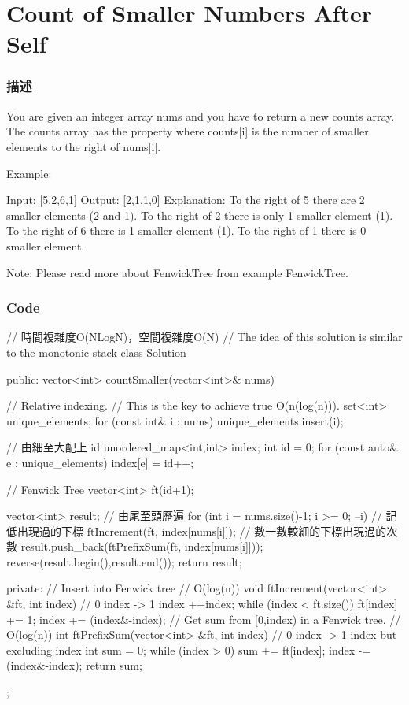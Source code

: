 \section{Count of Smaller Numbers After Self} %
\label{sec:count-of-smaller-numbers-after-self}

\subsubsection{描述}
You are given an integer array nums and you have to return a new counts array. The counts array has the property where counts[i] is the number of smaller elements to the right of nums[i].

Example:
\begin{Code}
Input: [5,2,6,1]
Output: [2,1,1,0] 
Explanation:
To the right of 5 there are 2 smaller elements (2 and 1).
To the right of 2 there is only 1 smaller element (1).
To the right of 6 there is 1 smaller element (1).
To the right of 1 there is 0 smaller element.
\end{Code}

Note:
Please read more about FenwickTree from example FenwickTree.

\subsubsection{Code}
\begin{Code}
// 時間複雜度O(NLogN)，空間複雜度O(N)
// The idea of this solution is similar to the monotonic stack
class Solution {
public:
    vector<int> countSmaller(vector<int>& nums)
    {
        // Relative indexing.
        // This is the key to achieve true O(n(log(n))).
        set<int> unique_elements;
        for (const int& i : nums) unique_elements.insert(i);

        // 由細至大配上 id
        unordered_map<int,int> index;
        int id = 0;
        for (const auto& e : unique_elements) index[e] = id++;

        // Fenwick Tree
        vector<int> ft(id+1);

        vector<int> result;
        // 由尾至頭歷遍
        for (int i = nums.size()-1; i >= 0; --i)
        {
            // 記低出現過的下標
            ftIncrement(ft, index[nums[i]]);
            // 數一數較細的下標出現過的次數
            result.push_back(ftPrefixSum(ft, index[nums[i]]));
        }
        reverse(result.begin(),result.end());
        return result;
    }
private:
    // Insert into Fenwick tree
    // O(log(n))
    void ftIncrement(vector<int> &ft, int index)
    {
        // 0 index -> 1 index
        ++index;
        while (index < ft.size())
        {
            ft[index] += 1;
            index += (index&-index);
        }
    }
    // Get sum from [0,index) in a Fenwick tree.
    // O(log(n))
    int ftPrefixSum(vector<int> &ft, int index)
    {
        // 0 index -> 1 index but excluding index
        int sum = 0;
        while (index > 0)
        {
            sum += ft[index];
            index -= (index&-index);
        }
        return sum;
    }
};
\end{Code}


